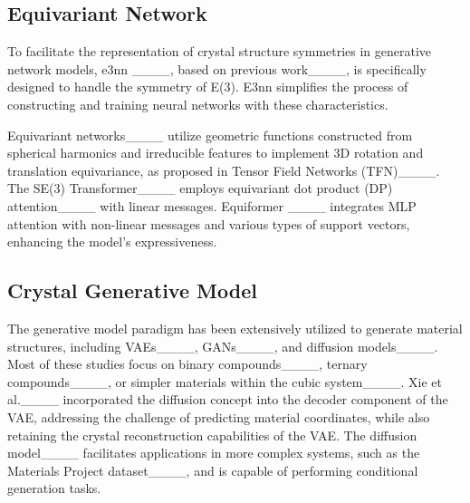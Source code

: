 \subsection{Equivariant Network}
\label{equnet}
To facilitate the representation of crystal structure symmetries in generative network models, e3nn ____, based on previous work____, is specifically designed to handle the symmetry of E(3). E3nn simplifies the process of constructing and training neural networks with these characteristics.

Equivariant networks____ utilize geometric functions constructed from spherical harmonics and irreducible features to implement 3D rotation and translation equivariance, as proposed in Tensor Field Networks (TFN)____. The SE(3) Transformer____ employs equivariant dot product (DP) attention____ with linear messages. Equiformer ____ integrates MLP attention with non-linear messages and various types of support vectors, enhancing the model's expressiveness.

\subsection{Crystal Generative Model}
\label{crygenmodel}
The generative model paradigm has been extensively utilized to generate material structures, including VAEs____, GANs____, and diffusion models____. Most of these studies focus on binary compounds____, ternary compounds____, or simpler materials within the cubic system____. Xie et al.____ incorporated the diffusion concept into the decoder component of the VAE, addressing the challenge of predicting material coordinates, while also retaining the crystal reconstruction capabilities of the VAE. The diffusion model____ facilitates applications in more complex systems, such as the Materials Project dataset____, and is capable of performing conditional generation tasks.